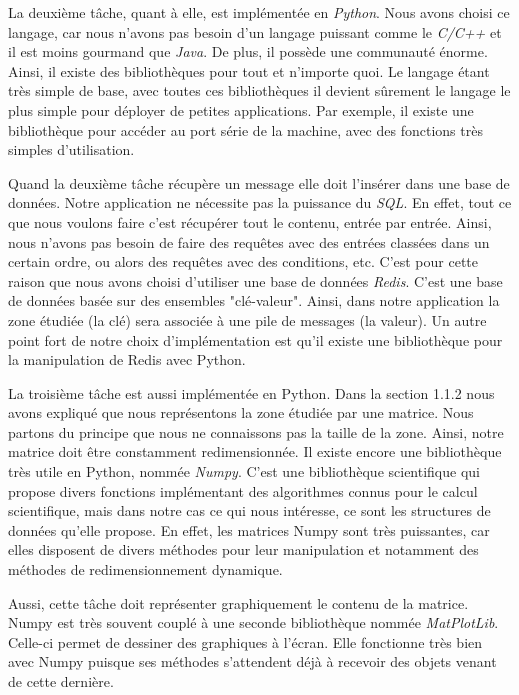 \documentclass[a4paper,10pt]{report}
\begin{document}
	La deuxième tâche, quant à elle, est implémentée en 
\textit{Python}\cite{python}. Nous avons choisi ce langage, car nous n'avons 
pas besoin d'un langage puissant comme le \textit{C/C++} et il est moins 
gourmand que \textit{Java}. De plus, il possède une communauté énorme. Ainsi, 
il existe des bibliothèques pour tout et n'importe quoi. Le langage étant très 
simple de base, avec toutes ces bibliothèques il devient sûrement le langage le 
plus simple pour déployer de petites applications. Par exemple, il existe une 
bibliothèque pour accéder au port série de la machine, avec des fonctions très 
simples d'utilisation.

	Quand la deuxième tâche récupère un message elle doit l'insérer dans 
une base de données. Notre application ne nécessite pas la puissance du 
\textit{SQL}. En effet, tout ce que nous voulons faire c'est récupérer tout le 
contenu, entrée par entrée. Ainsi, nous n'avons pas besoin de faire des 
requêtes avec des entrées classées dans un certain ordre, ou alors des requêtes 
avec des conditions, etc. C'est pour cette raison que nous avons choisi 
d'utiliser une base de données \textit{Redis}\cite{redis}. C'est une base de 
données basée sur des ensembles "clé-valeur". Ainsi, dans notre application la 
zone étudiée (la clé) sera associée à une pile de messages (la valeur). Un 
autre point fort de notre choix d'implémentation est qu'il existe une 
bibliothèque pour la manipulation de Redis avec Python. 

      La troisième tâche est aussi implémentée en Python. Dans la section 
1.1.2 nous avons expliqué que nous représentons la zone étudiée par une 
matrice. Nous partons du principe que nous ne connaissons pas la taille de la 
zone. Ainsi, notre matrice doit être constamment redimensionnée. Il existe 
encore une bibliothèque très utile en Python, nommée 
\textit{Numpy}\cite{numpy}. C'est une bibliothèque scientifique qui propose 
divers fonctions implémentant des algorithmes connus pour le calcul 
scientifique, mais dans notre cas ce qui nous intéresse, ce sont les structures 
de données qu'elle propose. En effet, les matrices Numpy sont très puissantes, 
car elles disposent de divers méthodes pour leur manipulation et notamment des 
méthodes de redimensionnement dynamique.

      Aussi, cette tâche doit représenter graphiquement le contenu de la 
matrice. Numpy est très souvent couplé à une seconde bibliothèque nommée 
\textit{MatPlotLib}\cite{matplotlib}. Celle-ci permet de dessiner des 
graphiques à l'écran. Elle fonctionne très bien avec Numpy puisque ses méthodes 
s'attendent déjà à recevoir des objets venant de cette dernière.
\end{document}
